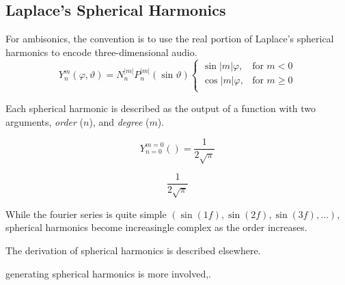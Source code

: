 \subsection{Laplace's Spherical Harmonics}
For ambisonics, the convention is to use the real portion of Laplace's
spherical harmonics to encode three-dimensional audio. 
\begin{equation}
Y_{n}^{m}(\varphi,\vartheta)=N_n^{|m|}P_n^{|m|}(\sin{\vartheta})
\begin{cases}
\sin{|m|\varphi},&  \text{for $m<0$}\\  
\cos{|m|\varphi},& \text{for $m\geq 0$}\\ 
\end{cases}
\end{equation}


Each spherical harmonic is described as the output of a
function with two arguments, \textit{order} ($n$), and
\textit{degree} ($m$).

\[
Y_{n=0}^{m=0}()=\frac{1}{2 \sqrt{\pi }}
\]

\[\frac{1}{2 \sqrt{\pi }} \]



While the fourier series is quite simple $(\sin(1f), \sin(2f),
\sin(3f), \ldots)$, spherical harmonics become increasingle complex as
the order increases. 

The derivation of spherical harmonics is described
elsewhere.\cite{Williams1999,Zotter2009a}


generating spherical harmonics is more involved,.



